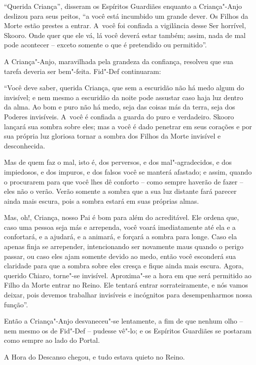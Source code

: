 ``Querida Criança'', disseram os Espíritos Guardiães enquanto a
Criança"-Anjo deslizou para seus peitos, ``a você está incumbido um
grande dever. Os Filhos da Morte estão prestes a entrar. A~você foi
confiada a vigilância desse Ser horrível, Skooro. Onde quer que ele vá,
lá você deverá estar também; assim, nada de mal pode acontecer -- exceto
somente o que é pretendido ou permitido''.

A Criança"-Anjo, maravilhada pela grandeza da confiança, resolveu que sua
tarefa deveria ser bem"-feita. Fid"-Def continuaram:

``Você deve saber, querida Criança, que sem a escuridão não há medo
algum do invisível; e nem mesmo a escuridão da noite pode assustar caso
haja luz dentro da alma. Ao bom e puro não há medo, seja das coisas más
da terra, seja dos Poderes invisíveis. A~você é confiada a guarda do
puro e verdadeiro. Skooro lançará sua sombra sobre eles; mas a você é
dado penetrar em seus corações e por sua própria luz gloriosa tornar a
sombra dos Filhos da Morte invisível e desconhecida.

Mas de quem faz o mal, isto é, dos perversos, e dos mal"-agradecidos, e
dos impiedosos, e dos impuros, e dos falsos você se manterá afastado; e
assim, quando o procurarem para que você lhes dê conforto -- como sempre
haverão de fazer -- eles não o verão. Verão somente a sombra que a sua
luz distante fará parecer ainda mais escura, pois a sombra estará em
suas próprias almas.

Mas, oh!, Criança, nosso Pai é bom para além do acreditável. Ele ordena
que, caso uma pessoa seja más e arrependa, você voará imediatamente até
ela e a confortará, e a ajudará, e a animará, e forçará a sombra para
longe. Caso ela apenas finja se arrepender, intencionando ser novamente
maus quando o perigo passar, ou caso eles ajam somente devido ao medo,
então você esconderá sua claridade para que a sombra sobre eles cresça e
fique ainda mais escura. Agora, querido Chiaro, torne"-se invisível.
Aproxima"-se a hora em que será permitido ao Filho da Morte entrar no
Reino. Ele tentará entrar sorrateiramente, e nós vamos deixar, pois
devemos trabalhar invisíveis e incógnitos para desempenharmos nossa
função''.

Então a Criança"-Anjo desvaneceu"-se lentamente, a fim de que nenhum olho
-- nem mesmo os de Fid"-Def -- pudesse vê"-lo; e os Espíritos Guardiães se
postaram como sempre ao lado do Portal.

A Hora do Descanso chegou, e tudo estava quieto no Reino.

